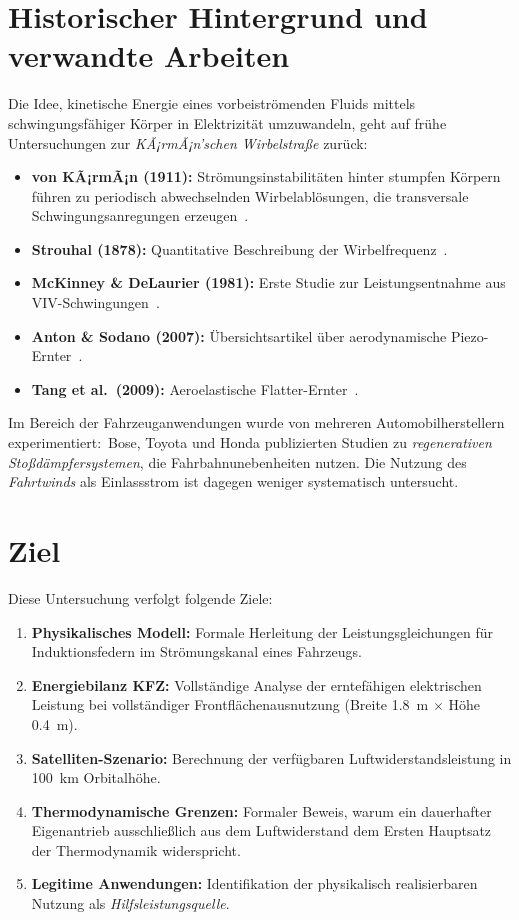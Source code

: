 ﻿\documentclass[12pt, a4paper]{report}
\theoremstyle{definition}
\theoremstyle{remark}
\begin{document}
\section{Historischer Hintergrund und verwandte Arbeiten}

Die Idee, kinetische Energie eines vorbeiströmenden Fluids mittels
schwingungsfähiger Körper in Elektrizität umzuwandeln, geht auf frühe
Untersuchungen zur \emph{KÃ¡rmÃ¡n'schen Wirbelstraße} zurück:

\begin{itemize}
  \item \textbf{von KÃ¡rmÃ¡n (1911):} Str\"omungsinstabilit\"aten hinter stumpfen
        K\"orpern f\"uhren zu periodisch abwechselnden Wirbelablösungen, die
        transversale Schwingungsanregungen erzeugen~\cite{karman1911}.
  \item \textbf{Strouhal (1878):} Quantitative Beschreibung der
        Wirbelfrequenz~\cite{strouhal1878}.
  \item \textbf{McKinney \& DeLaurier (1981):} Erste Studie zur Leistungsentnahme
        aus VIV-Schwingungen~\cite{mckinney1981}.
  \item \textbf{Anton \& Sodano (2007):} Übersichtsartikel über aerodynamische
        Piezo-Ernter~\cite{anton2007}.
  \item \textbf{Tang et al.\ (2009):} Aeroelastische Flatter-Ernter~\cite{tang2009}.
\end{itemize}

Im Bereich der Fahrzeuganwendungen wurde von mehreren Automobilherstellern
experimentiert:\ Bose, Toyota und Honda publizierten Studien zu
\emph{regenerativen Stoßdämpfersystemen}, die Fahrbahnunebenheiten nutzen.
Die Nutzung des \emph{Fahrtwinds} als Einlassstrom ist dagegen weniger
systematisch untersucht.

\section{Ziel}

Diese Untersuchung verfolgt folgende Ziele:

\begin{enumerate}[leftmargin=2em]
  \item \textbf{Physikalisches Modell:} Formale Herleitung der Leistungsgleichungen
        für Induktionsfedern im Strömungskanal eines Fahrzeugs.
  \item \textbf{Energiebilanz KFZ:} Vollständige Analyse der erntefähigen
        elektrischen Leistung bei vollständiger Frontflächenausnutzung
        (Breite \SI{1.8}{\metre} $\times$ Höhe \SI{0.4}{\metre}).
  \item \textbf{Satelliten-Szenario:} Berechnung der verfügbaren
        Luftwiderstandsleistung in \SI{100}{\kilo\metre} Orbitalhöhe.
  \item \textbf{Thermodynamische Grenzen:} Formaler Beweis, warum ein
        dauerhafter Eigenantrieb ausschließlich aus dem Luftwiderstand
        dem Ersten Hauptsatz der Thermodynamik widerspricht.
  \item \textbf{Legitime Anwendungen:} Identifikation der physikalisch
        realisierbaren Nutzung als \emph{Hilfsleistungsquelle}.
\end{enumerate}
\end{document}
